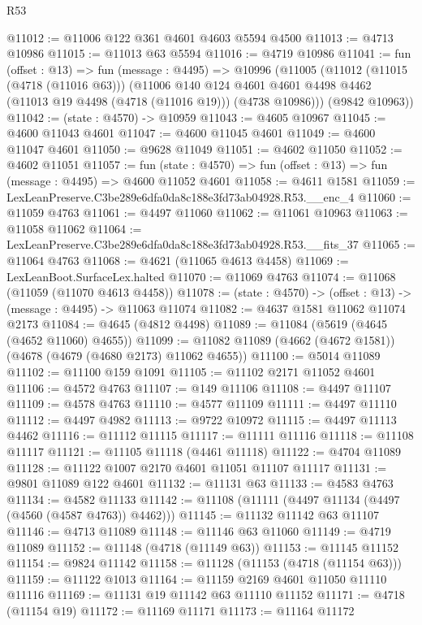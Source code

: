 \begin{lexlean}{R53}
\begin{coremodule}
@11012 := @11006 @122 @361 @4601 @4603 @5594 @4500
@11013 := @4713 @10986
@11015 := @11013 @63 @5594
@11016 := @4719 @10986
@11041 := fun (offset : @13) =>
  fun (message : @4495) =>
  @10996
    (@11005
      (@11012
        (@11015 (@4718 (@11016 @63)))
        (@11006
          @140
          @124
          @4601
          @4601
          @4498
          @4462
          (@11013 @19 @4498 (@4718 (@11016 @19)))
          (@4738 @10986)))
      (@9842 @10963))
@11042 := (state : @4570) -> @10959
@11043 := @4605 @10967
@11045 := @4600 @11043 @4601
@11047 := @4600 @11045 @4601
@11049 := @4600 @11047 @4601
@11050 := @9628 @11049
@11051 := @4602 @11050
@11052 := @4602 @11051
@11057 := fun (state : @4570) => fun (offset : @13) => fun (message : @4495) => @4600 @11052 @4601
@11058 := @4611 @1581
@11059 := LexLeanPreserve.C3be289e6dfa0da8c188e3fd73ab04928.R53.__enc_4
@11060 := @11059 @4763
@11061 := @4497 @11060
@11062 := @11061 @10963
@11063 := @11058 @11062
@11064 := LexLeanPreserve.C3be289e6dfa0da8c188e3fd73ab04928.R53.__fits_37
@11065 := @11064 @4763
@11068 := @4621 (@11065 @4613 @4458)
@11069 := LexLeanBoot.SurfaceLex.halted
@11070 := @11069 @4763
@11074 := @11068 (@11059 (@11070 @4613 @4458))
@11078 := (state : @4570) -> (offset : @13) -> (message : @4495) -> @11063 @11074
@11082 := @4637 @1581 @11062 @11074 @2173
@11084 := @4645 (@4812 @4498)
@11089 := @11084 (@5619 (@4645 (@4652 @11060) @4655))
@11099 := @11082 @11089 (@4662 (@4672 @1581)) (@4678 (@4679 (@4680 @2173) @11062 @4655))
@11100 := @5014 @11089
@11102 := @11100 @159 @1091
@11105 := @11102 @2171 @11052 @4601
@11106 := @4572 @4763
@11107 := @149 @11106
@11108 := @4497 @11107
@11109 := @4578 @4763
@11110 := @4577 @11109
@11111 := @4497 @11110
@11112 := @4497 @4982
@11113 := @9722 @10972
@11115 := @4497 @11113 @4462
@11116 := @11112 @11115
@11117 := @11111 @11116
@11118 := @11108 @11117
@11121 := @11105 @11118 (@4461 @11118)
@11122 := @4704 @11089
@11128 := @11122 @1007 @2170 @4601 @11051 @11107 @11117
@11131 := @9801 @11089 @122 @4601
@11132 := @11131 @63
@11133 := @4583 @4763
@11134 := @4582 @11133
@11142 := @11108 (@11111 (@4497 @11134 (@4497 (@4560 (@4587 @4763)) @4462)))
@11145 := @11132 @11142 @63 @11107
@11146 := @4713 @11089
@11148 := @11146 @63 @11060
@11149 := @4719 @11089
@11152 := @11148 (@4718 (@11149 @63))
@11153 := @11145 @11152
@11154 := @9824 @11142
@11158 := @11128 (@11153 (@4718 (@11154 @63)))
@11159 := @11122 @1013
@11164 := @11159 @2169 @4601 @11050 @11110 @11116
@11169 := @11131 @19 @11142 @63 @11110 @11152
@11171 := @4718 (@11154 @19)
@11172 := @11169 @11171
@11173 := @11164 @11172

\end{coremodule}
\end{lexlean}
